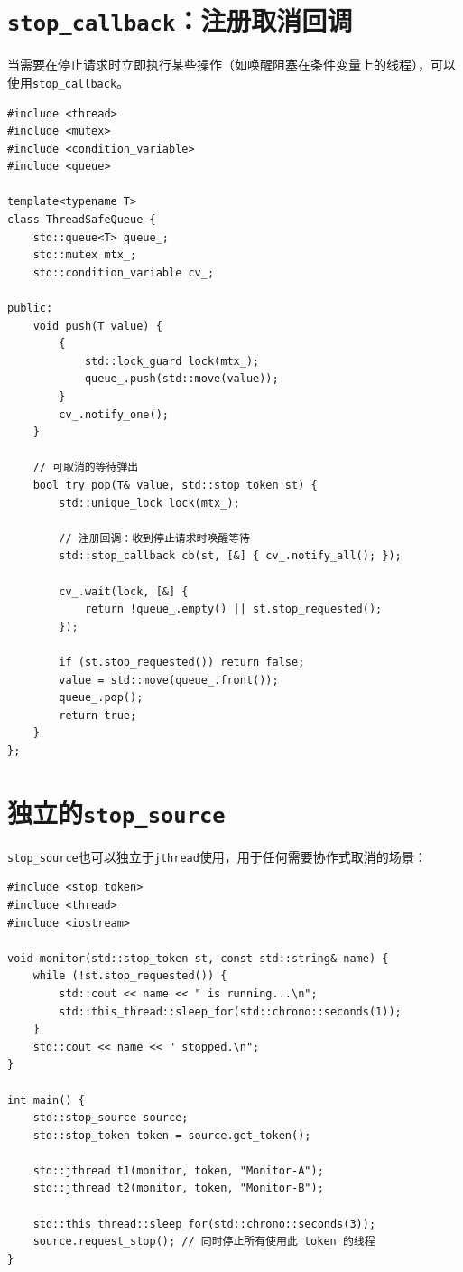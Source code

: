\documentclass[12pt,a4paper,fontset=fandol]{ctexbook}
\begin{document}
\section{\texttt{stop\_callback}：注册取消回调}

当需要在停止请求时立即执行某些操作（如唤醒阻塞在条件变量上的线程），可以使用\texttt{stop\_callback}。

\begin{lstlisting}
#include <thread>
#include <mutex>
#include <condition_variable>
#include <queue>

template<typename T>
class ThreadSafeQueue {
    std::queue<T> queue_;
    std::mutex mtx_;
    std::condition_variable cv_;

public:
    void push(T value) {
        {
            std::lock_guard lock(mtx_);
            queue_.push(std::move(value));
        }
        cv_.notify_one();
    }

    // 可取消的等待弹出
    bool try_pop(T& value, std::stop_token st) {
        std::unique_lock lock(mtx_);

        // 注册回调：收到停止请求时唤醒等待
        std::stop_callback cb(st, [&] { cv_.notify_all(); });

        cv_.wait(lock, [&] {
            return !queue_.empty() || st.stop_requested();
        });

        if (st.stop_requested()) return false;
        value = std::move(queue_.front());
        queue_.pop();
        return true;
    }
};
\end{lstlisting}

\section{独立的\texttt{stop\_source}}

\texttt{stop\_source}也可以独立于\texttt{jthread}使用，用于任何需要协作式取消的场景：

\begin{lstlisting}
#include <stop_token>
#include <thread>
#include <iostream>

void monitor(std::stop_token st, const std::string& name) {
    while (!st.stop_requested()) {
        std::cout << name << " is running...\n";
        std::this_thread::sleep_for(std::chrono::seconds(1));
    }
    std::cout << name << " stopped.\n";
}

int main() {
    std::stop_source source;
    std::stop_token token = source.get_token();

    std::jthread t1(monitor, token, "Monitor-A");
    std::jthread t2(monitor, token, "Monitor-B");

    std::this_thread::sleep_for(std::chrono::seconds(3));
    source.request_stop(); // 同时停止所有使用此 token 的线程
}
\end{lstlisting}
\end{document}
